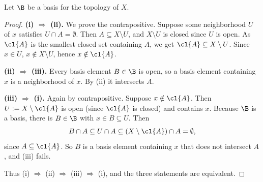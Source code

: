 
Let $\B$ be a basis for the topology of $X$.

\begin{proof}
\textbf{(i) $\Rightarrow$ (ii).} We prove the contrapositive. Suppose some neighborhood $U$ of
$x$ satisfies $U\cap A=\emptyset$. Then $A\subseteq X\setminus U$, and $X\setminus U$ is closed
since $U$ is open. As $\cl{A}$ is the smallest closed set containing $A$, we get
$\cl{A}\subseteq X\setminus U$. Since $x\in U$, $x\notin X\setminus U$, hence $x\notin\cl{A}$.

\textbf{(ii) $\Rightarrow$ (iii).} Every basis element $B\in\B$ is open, so a basis element
containing $x$ is a neighborhood of $x$. By (ii) it intersects $A$.

\textbf{(iii) $\Rightarrow$ (i).} Again by contrapositive. Suppose $x\notin\cl{A}$. Then
$U:=X\setminus\cl{A}$ is open (since $\cl{A}$ is closed) and contains $x$. Because $\B$ is a
basis, there is $B\in\B$ with $x\in B\subseteq U$. Then
\[ B\cap A\subseteq U\cap A\subseteq(X\setminus\cl{A})\cap A=\emptyset, \]
since $A\subseteq\cl{A}$. So $B$ is a basis element containing $x$ that does not intersect $A$,
and (iii) fails.

Thus (i) $\Rightarrow$ (ii) $\Rightarrow$ (iii) $\Rightarrow$ (i), and the three statements are
equivalent.
\end{proof}
